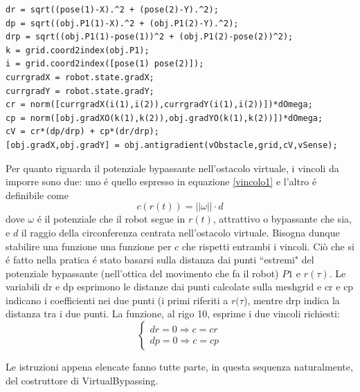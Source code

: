 \documentclass[14pt,a4paper]{extarticle}
\begin{document}
\begin{enumerate}
\begin{lstlisting}[caption=Istruzioni per calcolare il potenziale bypassante virtuale]
dr = sqrt((pose(1)-X).^2 + (pose(2)-Y).^2);
dp = sqrt((obj.P1(1)-X).^2 + (obj.P1(2)-Y).^2);
drp = sqrt((obj.P1(1)-pose(1))^2 + (obj.P1(2)-pose(2))^2);
k = grid.coord2index(obj.P1); 
i = grid.coord2index([pose(1) pose(2)]);
currgradX = robot.state.gradX;
currgradY = robot.state.gradY;
cr = norm([currgradX(i(1),i(2)),currgradY(i(1),i(2))])*dOmega;
cp = norm([obj.gradXO(k(1),k(2)),obj.gradYO(k(1),k(2))])*dOmega;
cV = cr*(dp/drp) + cp*(dr/drp);
[obj.gradX,obj.gradY] = obj.antigradient(vObstacle,grid,cV,vSense);
\end{lstlisting}
Per quanto riguarda il potenziale bypassante nell'ostacolo virtuale, i vincoli da imporre sono due: uno é quello espresso in equazione \ref{vincolo1} e l'altro é definibile come \begin{equation}
c(r(t)) = ||\omega||\cdot d
\end{equation} dove \(\omega\) é il potenziale che il robot segue in \(r(t)\), attrattivo o bypassante che sia, e \(d\) il raggio della circonferenza centrata nell'ostacolo virtuale. Bisogna dunque stabilire una funzione una funzione per \(c\) che rispetti entrambi i vincoli. Ciò che si é fatto nella pratica é stato basarsi sulla distanza dai punti ``estremi" del potenziale bypassante (nell'ottica del movimento che fa il robot) \(P1\) e \(r(\tau)\). Le variabili dr e dp esprimono le distanze dai punti calcolate sulla meshgrid e cr e cp indicano i coefficienti nei due punti (i primi riferiti a \(r(\tau\)), mentre drp indica la distanza tra i due punti. La funzione, al rigo 10, esprime i due vincoli richiesti: 
\[
\begin{cases}
dr=0 \Rightarrow c=cr \\
dp=0 \Rightarrow c=cp
\end{cases}
\]
\end{enumerate}
Le istruzioni appena elencate fanno tutte parte, in questa sequenza naturalmente, del costruttore di VirtualBypassing.
	
\end{document}
